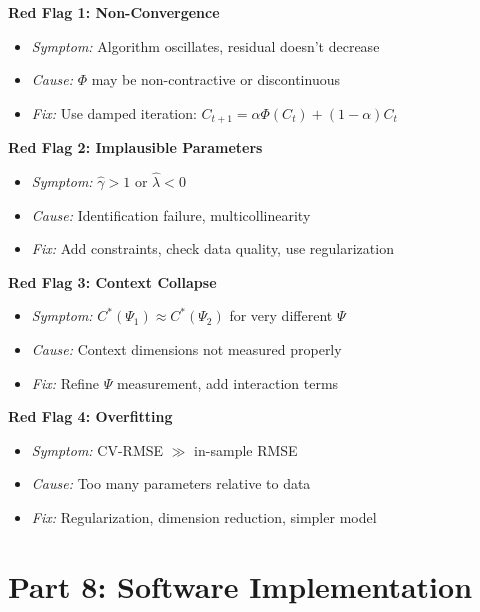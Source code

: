 \begin{tcolorbox}[colback=red!5!white, colframe=red!75!black,
    title=Warning Signs in EBF Estimation]

\textbf{Red Flag 1: Non-Convergence}
\begin{itemize}[nosep]
\item \textit{Symptom:} Algorithm oscillates, residual doesn't decrease
\item \textit{Cause:} $\Phi$ may be non-contractive or discontinuous
\item \textit{Fix:} Use damped iteration: $C_{t+1} = \alpha \Phi(C_t) + (1-\alpha)C_t$
\end{itemize}

\textbf{Red Flag 2: Implausible Parameters}
\begin{itemize}[nosep]
\item \textit{Symptom:} $\hat{\gamma} > 1$ or $\hat{\lambda} < 0$
\item \textit{Cause:} Identification failure, multicollinearity
\item \textit{Fix:} Add constraints, check data quality, use regularization
\end{itemize}

\textbf{Red Flag 3: Context Collapse}
\begin{itemize}[nosep]
\item \textit{Symptom:} $C^*(\Psi_1) \approx C^*(\Psi_2)$ for very different $\Psi$
\item \textit{Cause:} Context dimensions not measured properly
\item \textit{Fix:} Refine $\Psi$ measurement, add interaction terms
\end{itemize}

\textbf{Red Flag 4: Overfitting}
\begin{itemize}[nosep]
\item \textit{Symptom:} CV-RMSE $\gg$ in-sample RMSE
\item \textit{Cause:} Too many parameters relative to data
\item \textit{Fix:} Regularization, dimension reduction, simpler model
\end{itemize}
\end{tcolorbox}


\section{Part 8: Software Implementation}
\label{sec:az-software}

